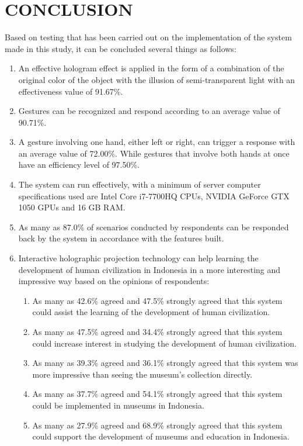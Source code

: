\documentclass[conference]{IEEEtran}
\begin{document}
\section{CONCLUSION}
	Based on testing that has been carried out on the implementation of the system made in this study, it can be concluded several things as follows:
	\begin{enumerate}
		\item An effective hologram effect is applied in the form of a combination of the original color of the object with the illusion of semi-transparent light with an effectiveness value of 91.67\%.
		\item Gestures can be recognized and respond according to an average value of 90.71\%.
		\item A gesture involving one hand, either left or right, can trigger a response with an average value of 72.00\%. While gestures that involve both hands at once have an efficiency level of 97.50\%.
		\item The system can run effectively, with a minimum of server computer specifications used are Intel Core i7-7700HQ CPUs, NVIDIA GeForce GTX 1050 GPUs and 16 GB RAM.
		\item As many as 87.0\% of scenarios conducted by respondents can be responded back by the system in accordance with the features built. 
		\item Interactive holographic projection technology can help learning the development of human civilization in Indonesia in a more interesting and impressive way based on the opinions of respondents:
		\begin{enumerate}
			\item As many as 42.6\% agreed and 47.5\% strongly agreed that this system could assist the learning of the development of human civilization.
			\item As many as 47.5\% agreed and 34.4\% strongly agreed that this system could increase interest in studying the development of human civilization.
			\item As many as 39.3\% agreed and 36.1\% strongly agreed that this system was more impressive than seeing the museum's collection directly.
			\item As many as 37.7\% agreed and 54.1\% strongly agreed that this system could be implemented in museums in Indonesia.
			\item As many as 27.9\% agreed and 68.9\% strongly agreed that this system could support the development of museums and education in Indonesia.
		\end{enumerate}
	\end{enumerate}



\vspace{12pt}	
\end{document}
